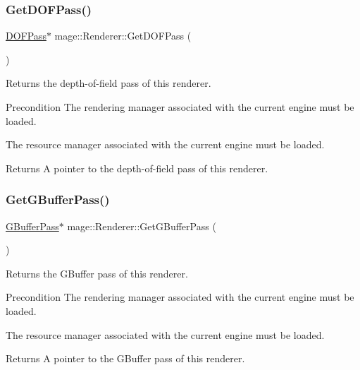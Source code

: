 \subsubsection{\texorpdfstring{Get\+D\+O\+F\+Pass()}{GetDOFPass()}}
{\footnotesize\ttfamily \hyperlink{classmage_1_1_d_o_f_pass}{D\+O\+F\+Pass}$\ast$ mage\+::\+Renderer\+::\+Get\+D\+O\+F\+Pass (\begin{DoxyParamCaption}{ }\end{DoxyParamCaption})}

Returns the depth-\/of-\/field pass of this renderer.

\begin{DoxyPrecond}{Precondition}
The rendering manager associated with the current engine must be loaded. 

The resource manager associated with the current engine must be loaded. 
\end{DoxyPrecond}
\begin{DoxyReturn}{Returns}
A pointer to the depth-\/of-\/field pass of this renderer. 
\end{DoxyReturn}
\hypertarget{classmage_1_1_renderer_a65fbd3dddaf1bff3fc9f53e00c38bb62}{}\label{classmage_1_1_renderer_a65fbd3dddaf1bff3fc9f53e00c38bb62} 
\subsubsection{\texorpdfstring{Get\+G\+Buffer\+Pass()}{GetGBufferPass()}}
{\footnotesize\ttfamily \hyperlink{classmage_1_1_g_buffer_pass}{G\+Buffer\+Pass}$\ast$ mage\+::\+Renderer\+::\+Get\+G\+Buffer\+Pass (\begin{DoxyParamCaption}{ }\end{DoxyParamCaption})}

Returns the G\+Buffer pass of this renderer.

\begin{DoxyPrecond}{Precondition}
The rendering manager associated with the current engine must be loaded. 

The resource manager associated with the current engine must be loaded. 
\end{DoxyPrecond}
\begin{DoxyReturn}{Returns}
A pointer to the G\+Buffer pass of this renderer. 
\end{DoxyReturn}
\hypertarget{classmage_1_1_renderer_a6b43c7342a017282e5f9f14ac581ea2b}{}\label{classmage_1_1_renderer_a6b43c7342a017282e5f9f14ac581ea2b} 
